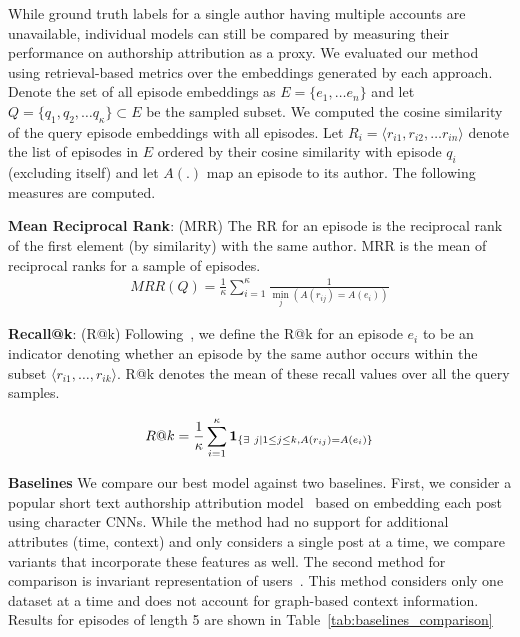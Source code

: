 \label{sec:sysml:eval}
While ground truth labels for a single author having multiple accounts are unavailable, individual models can still be compared by measuring their performance on authorship attribution as a proxy. 
We evaluated our method using retrieval-based metrics over the embeddings generated by each approach. %
Denote the set of all episode embeddings as $E = \{e_1, \dots e_n\}$ and let $Q = \{q_1, q_2, \dots q_\kappa\} \subset E$ be the sampled subset.
We computed the cosine similarity of the query episode embeddings with all episodes. Let $R_i = \langle r_{i1}, r_{i2}, \dots r_{in} \rangle$ denote the list of episodes in $E$ ordered by their cosine similarity with episode $q_i$ (excluding itself) and let $A(.)$ map an episode to its author. The following measures are computed.

\noindent \textbf{Mean Reciprocal Rank}: (MRR) The RR for an episode is the reciprocal rank of the first element (by similarity) with the same author. MRR is the mean of reciprocal ranks for a sample of episodes.
\begin{align*}
    MRR(Q) = \frac{1}{\kappa}\sum_{i=1}^\kappa \frac{1}{\min\limits_j  \left(A(r_{ij}) = A(e_i)\right)}
\end{align*}

\noindent \textbf{Recall@k}:  (R@k)  Following~\citet{andrews2019learning}, we define the R@k for an episode $e_i$ to be an indicator denoting whether an episode by the same author occurs within the subset $ \langle r_{i1}, \dots, r_{ik} \rangle$. R@k denotes the mean of these recall values over all the query samples.

\begin{align*}
    R@k = \frac{1}{\kappa}\sum\limits_{i=1}^{\kappa}{\bm{1}_{\{\exists\ j | 1 \leq j \leq k, A(r_{ij}) = A(e_i)\}}}
\end{align*}

\noindent \textbf{Baselines}
We compare our best model against two baselines. First, we consider a popular short text authorship attribution model~\cite{shrestha2017convolutional} based on embedding each post using character CNNs. 
While the method had no support for additional attributes (time, context) and only considers a single post at a time, we compare variants that incorporate these features as well. 
The second method for comparison is invariant representation of users~\cite{andrews2019learning}. This method considers only one dataset at a time and does not account for graph-based context information. 
Results for episodes of length 5 are shown in Table~\ref{tab:baselines_comparison}

